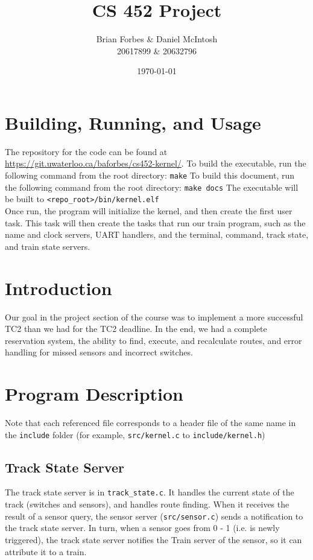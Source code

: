 \documentclass{article}
\begin{document}
\title{CS 452 Project}
\author{Brian Forbes \& Daniel McIntosh \\ 20617899 \& 20632796}
\date{\today}

\maketitle

\section{ Building, Running, and Usage }

The repository for the code can be found at \url{https://git.uwaterloo.ca/baforbes/cs452-kernel/}.
To build the executable, run the following command from the root directory: \verb|make|
To build this document, run the following command from the root directory: \verb|make docs|
The executable will be built to \verb|<repo_root>/bin/kernel.elf|\\

Once run, the program will initialize the kernel, and then create the first user task. This task will then create the tasks that run our train program, such as the name and clock servers, UART handlers, and the terminal, command, track state, and train state servers.

\section{Introduction}
Our goal in the project section of the course was to implement a more successful TC2 than we had for the TC2 deadline.
In the end, we had a complete reservation system, the ability to find, execute, and recalculate routes, and error handling for missed sensors and incorrect switches.

\section{Program Description}
Note that each referenced file corresponds to a header file of the same name in the \verb|include| folder (for example, \verb|src/kernel.c| to \verb|include/kernel.h|)

\subsection{ Track State Server}
The track state server is in \verb|track_state.c|.
It handles the current state of the track (switches and sensors), and handles route finding. When it receives the result of a sensor query, the sensor server (\verb|src/sensor.c|) sends a notification to the track state server. In turn, when a sensor goes from 0 - 1 (i.e. is newly triggered), the track state server notifies the Train server of the sensor, so it can attribute it to a train.
\end{document}
